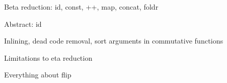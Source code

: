 Beta reduction: id, const, ++, map, concat, foldr

Abstract: id

Inlining, dead code removal, sort arguments in commutative functions

Limitations to eta reduction

Everything about flip



